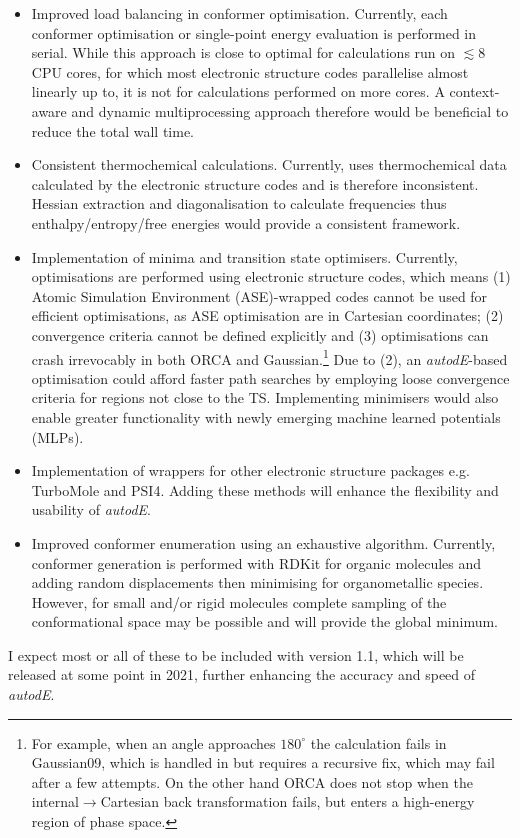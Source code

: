 \documentclass[../../main.tex]{subfiles}
\begin{document}
\begin{itemize}
	\item Improved load balancing in conformer optimisation. Currently, each conformer optimisation or single-point energy evaluation is performed in serial. While this approach is close to optimal for calculations run on $\lesssim 8$ CPU cores, for which most electronic structure codes parallelise almost linearly up to, it is not for \ade calculations performed on more cores. A context-aware and dynamic multiprocessing approach therefore would be beneficial to reduce the total wall time.
	
	\item Consistent thermochemical calculations. Currently, \ade uses thermochemical data calculated by the electronic structure codes and is therefore inconsistent. Hessian extraction and diagonalisation to calculate frequencies thus enthalpy/entropy/free energies would provide a consistent framework.
	
	\item Implementation of minima and transition state optimisers. Currently, optimisations are performed using electronic structure codes, which means (1) Atomic Simulation Environment (ASE\cite{ASE2017})-wrapped codes cannot be used for efficient optimisations, as ASE optimisation are in Cartesian coordinates; (2) convergence criteria cannot be defined explicitly and (3) optimisations can crash irrevocably in both ORCA and Gaussian.\footnote{For example, when an angle approaches ${180}^{\circ}$ the calculation fails in Gaussian09, which is handled in \ade but requires a recursive fix, which may fail after a few attempts. On the other hand ORCA does not stop when the internal$\rightarrow$Cartesian back transformation fails, but enters a high-energy region of phase space.} Due to (2), an \emph{autodE}-based optimisation could afford faster path searches by employing loose convergence criteria for regions not close to the TS. Implementing minimisers would also enable greater functionality with newly emerging machine learned potentials (MLPs).
	
	\item Implementation of wrappers for other electronic structure packages e.g. TurboMole and PSI4. Adding these methods will enhance the flexibility and usability of \emph{autodE}.
	
	\item Improved conformer enumeration using an exhaustive algorithm. Currently, conformer generation is performed with RDKit for organic molecules and adding random displacements then minimising for organometallic species. However, for small and/or rigid molecules complete sampling of the conformational space may be possible and will provide the global minimum.
	
\end{itemize}

I expect most or all of these to be included with version 1.1, which will be released at some point in 2021, further enhancing the accuracy and speed of \emph{autodE}.


\clearpage
\end{document}
